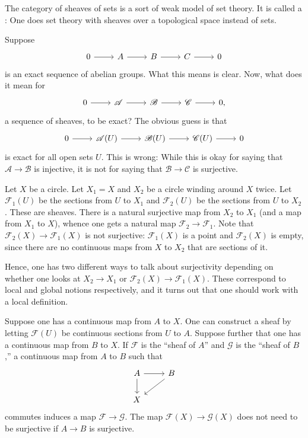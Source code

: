\documentclass [11 pt, oneside, margin = 1 in] {article}
\begin{document}
The category of sheaves of sets is a sort of weak model of set theory. It is called a : One does set theory with sheaves over a topological space instead of sets.

Suppose
\[
\begin{tikzcd}
	0\ar[r]&A\ar[r]&B\ar[r]&C\ar[r]&0
\end{tikzcd}
\]
is an exact sequence of abelian groups. What this means is clear. Now, what does it mean for
\[
\begin{tikzcd}
        0\ar[r]&\mathscr{A}\ar[r]&\mathscr{B}\ar[r]&\mathscr{C}\ar[r]&0,
\end{tikzcd}
\]
a sequence of sheaves, to be exact? The obvious guess is that
\[
\begin{tikzcd}
	0\ar[r]&\mathscr{A}(U)\ar[r]&\mathscr{B}(U)\ar[r]&\mathscr{C}(U)\ar[r]&0
\end{tikzcd}
\]
is exact for all open sets $U$. This is wrong: While this is okay for saying that $\mathscr{A}\longrightarrow \mathscr{B}$ is injective, it is not for saying that $\mathscr{B} \longrightarrow \mathscr{C}$ is surjective.

\begin{example}[ ]\label{}\text{}
Let $X$ be a circle. Let $X_1=X$ and $X_2$ be a circle winding around $X$ twice. Let $\mathscr{F}_1(U)$ be the sections from $U$ to $X_1$ and $\mathscr{F}_2(U)$ be the sections from $U$ to $X_2$. These are sheaves. There is a natural surjective map from $X_2$ to $X_1$ (and a map from $X_1$ to $X$), whence one gets a natural map $\mathscr{F}_2\longrightarrow \mathscr{F}_1$. Note that $\mathscr{F}_2(X) \longrightarrow \mathscr{F}_1(X)$ is not surjective: $\mathscr{F}_1(X)$ is a point and $\mathscr{F}_2(X)$ is empty, since there are no continuous maps from $X$ to $X_2$ that are sections of it.

Hence, one has two different ways to talk about surjectivity depending on whether one looks at $X_2\longrightarrow X_1$ or $\mathscr{F}_2(X) \longrightarrow \mathscr{F}_1(X)$. These correspond to local and global notions respectively, and it turns out that one should work with a local definition. 
\end{example}

Suppose one has a continuous map from $A$ to $X$. One can construct a sheaf by letting $\mathscr{F}(U)$ be continuous sections from $U$ to $A$. Suppose further that one has a continuous map from $B$ to $X$. If $\mathscr{F}$ is the ``sheaf of $A$'' and $\mathscr{G}$ is the ``sheaf of $B$,'' a continuous map from $A$ to $B$ such that
\[
\begin{tikzcd}
	A \ar[d]\ar[r] &B\ar[dl]\\X
\end{tikzcd}
\]
commutes induces a map $\mathscr{F}\longrightarrow \mathscr{G}$. The map $\mathscr{F}(X) \longrightarrow \mathscr{G}(X)$ does not need to be surjective if $A\longrightarrow B$ is surjective.
\end{document}
